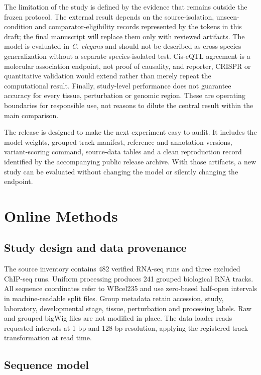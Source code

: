 \documentclass[pdflatex,sn-nature]{sn-jnl}
\newcommand{\ExtRelease}{the accompanying public release archive}
\begin{document}
The limitation of the study is defined by the evidence that remains outside
the frozen protocol. The external result depends on the source-isolation,
unseen-condition and comparator-eligibility records represented by the tokens
in this draft; the final manuscript will replace them only with reviewed
artifacts. The model is evaluated in \textit{C. elegans} and should not be
described as cross-species generalization without a separate species-isolated
test. Cis-eQTL agreement is a molecular association endpoint, not proof of
causality, and reporter, CRISPR or quantitative validation would extend rather
than merely repeat the computational result. Finally, study-level performance
does not guarantee accuracy for every tissue, perturbation or genomic region.
These are operating boundaries for responsible use, not reasons to dilute the
central result within the main comparison.

The release is designed to make the next experiment easy to audit. It includes
the model weights, grouped-track manifest, reference and annotation versions,
variant-scoring command, source-data tables and a clean reproduction record
identified by \ExtRelease. With those artifacts, a new study can be evaluated
without changing the model or silently changing the endpoint.

\section{Online Methods}\label{sec:methods}

\subsection{Study design and data provenance}

The source inventory contains 482 verified RNA-seq runs and three excluded
ChIP-seq runs. Uniform processing produces 241 grouped biological RNA tracks.
All sequence coordinates refer to WBcel235 and use zero-based half-open
intervals in machine-readable split files. Group metadata retain accession,
study, laboratory, developmental stage, tissue, perturbation and processing
labels. Raw and grouped bigWig files are not modified in place. The data loader
reads requested intervals at 1-bp and 128-bp resolution, applying the registered
track transformation at read time.

\subsection{Sequence model}
\end{document}
